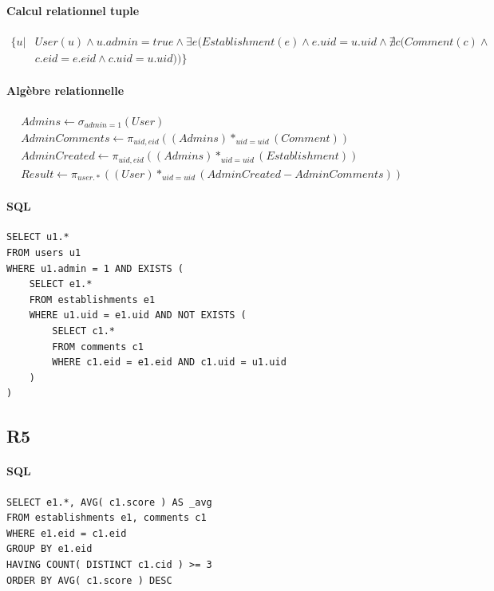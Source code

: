 \documentclass[11pt,a4paper]{report}
\begin{document}
\paragraph*{Calcul relationnel tuple}
\begin{align*}
\{ u|& User(u)  \wedge u.admin =true  \wedge \exists e (Establishment(e) \wedge e.uid = u.uid  \wedge \nexists c ( Comment(c) \wedge \\
& c.eid = e.eid \wedge c.uid = u.uid )) \} 
\end{align*}
\paragraph*{Algèbre relationnelle}
\begin{align*}
& Admins \leftarrow \sigma_{admin=1} (User) \\
& AdminComments \leftarrow \pi_{uid, eid} ( (Admins) *_{uid=uid} (Comment) ) \\
& AdminCreated \leftarrow \pi_{uid, eid} ( (Admins) *_{uid=uid} (Establishment) ) \\
& Result \leftarrow \pi_{user.*} ( (User) *_{uid=uid} (AdminCreated - AdminComments) )
\end{align*}
\paragraph*{SQL}
\begin{verbatim}
SELECT u1.*
FROM users u1
WHERE u1.admin = 1 AND EXISTS (
    SELECT e1.*
    FROM establishments e1
    WHERE u1.uid = e1.uid AND NOT EXISTS (
        SELECT c1.*
        FROM comments c1
        WHERE c1.eid = e1.eid AND c1.uid = u1.uid
    )
)
\end{verbatim}

\subsection*{R5}


\paragraph*{SQL}
\begin{verbatim}
SELECT e1.*, AVG( c1.score ) AS _avg
FROM establishments e1, comments c1
WHERE e1.eid = c1.eid 
GROUP BY e1.eid 
HAVING COUNT( DISTINCT c1.cid ) >= 3
ORDER BY AVG( c1.score ) DESC
\end{verbatim}
\end{document}

